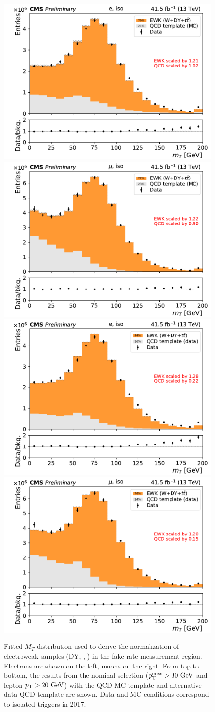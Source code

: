 \begin{figure}[!hbtp]
  \centering
  \includegraphics[width=.45\textwidth]{figs/ssan/fakerate/derivation/y2017/y2017_el_iso_mt_lin_postfit_mctemp.pdf}
  \includegraphics[width=.45\textwidth]{figs/ssan/fakerate/derivation/y2017/y2017_mu_iso_mt_lin_postfit_mctemp.pdf} \\
  \includegraphics[width=.45\textwidth]{figs/ssan/fakerate/derivation/y2017/y2017_el_iso_mt_lin_postfit_datatemp.pdf}
  \includegraphics[width=.45\textwidth]{figs/ssan/fakerate/derivation/y2017/y2017_mu_iso_mt_lin_postfit_datatemp.pdf}
  \caption{ 
  Fitted $M_T$ distribution used to derive the
  normalization of electroweak samples (DY, \wjets, \ttjets) in the fake rate measurement region.
  Electrons are shown on the left, muons on the right.
  From top to bottom, the results from the nominal selection ($p_{\mathrm{T}}^\text{miss}>30~\text{GeV}$ and 
  lepton $p_{\mathrm{T}} > 20~\text{GeV}$) with the QCD MC template and alternative data QCD template are shown. 
  Data and MC conditions correspond to isolated triggers in 2017.
  }
  \label{fig:EWKnormalization2017iso}
  \end{figure}

